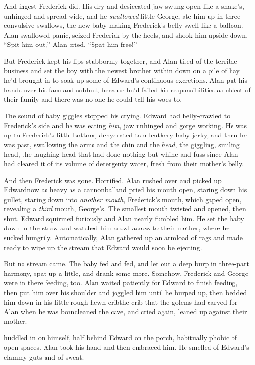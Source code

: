 And ingest Frederick did.  His dry and desiccated jaw swung open like
a snake's, unhinged and spread wide, and he \textit{swallowed} little
George, ate him up in three convulsive swallows, the new baby making
Frederick's belly swell like a balloon.  Alan swallowed panic, seized
Frederick by the heels, and shook him upside down.  ``Spit him out,''
Alan cried, ``Spat him free!''

But Frederick kept his lips stubbornly together, and Alan tired of the
terrible business and set the boy with the newest brother within down
on a pile of hay he'd brought in to soak up some of Edward's
continuous excretions.  Alan put his hands over his face and sobbed,
because he'd failed his responsibilities as eldest of their family and
there was no one he could tell his woes to.

The sound of baby giggles stopped his crying.  Edward had
belly-crawled to Frederick's side and he was eating \textit{him}, jaw
unhinged and gorge working.  He was up to Frederick's little bottom,
dehydrated to a leathery baby-jerky, and then he was past, swallowing
the arms and the chin and the \textit{head}, the giggling, smiling
head, the laughing head that had done nothing but whine and fuss since
Alan had cleared it of its volume of detergenty water, fresh from
their mother's belly.

And then Frederick was gone.  Horrified, Alan rushed over and picked
up Edward\dash{}now as heavy as a cannonball\dash{}and pried his mouth open,
staring down his gullet, staring down into \textit{another mouth},
Frederick's mouth, which gaped open, revealing a \textit{third} mouth,
George's.  The smallest mouth twisted and opened, then shut.  Edward
squirmed furiously and Alan nearly fumbled him.  He set the baby down
in the straw and watched him crawl across to their mother, where he
sucked hungrily.  Automatically, Alan gathered up an armload of rags
and made ready to wipe up the stream that Edward would soon be
ejecting.

But no stream came.  The baby fed and fed, and let out a deep burp in
three-part harmony, spat up a little, and drank some more.  Somehow,
Frederick and George were in there feeding, too.  Alan waited
patiently for Edward to finish feeding, then put him over his shoulder
and joggled him until he burped up, then bedded him down in his little
rough-hewn crib\dash{}the crib that the golems had carved for Alan when he
was born\dash{}cleaned the cave, and cried again, leaned up against their
mother.

 huddled in on himself, half behind Edward on the porch,
habitually phobic of open spaces.  Alan took his hand and then
embraced him.  He smelled of Edward's clammy guts and of sweat.


